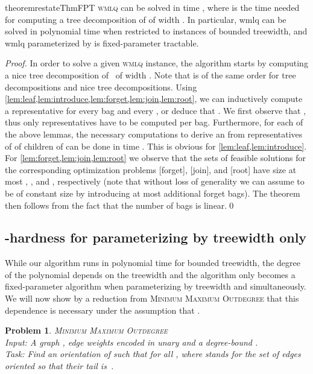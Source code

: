 \documentclass{llncs}
\newtheorem{pr}[theorem]{Problem}
\begin{document}
\begin{restatable}{theorem}{restateThmFPT}
\label{th:bounded_tw}
\textsc{wmlq} can be solved in time , where  is the time needed for computing a tree decomposition of  of width . In particular, {\sc wmlq} can be solved in polynomial time when restricted to instances of bounded treewidth, and {\sc wmlq} parameterized by  is fixed-parameter tractable. 
\end{restatable}

\begin{proof} 
  In order to solve a given \textsc{wmlq} instance, the algorithm starts by computing a nice tree decomposition of~ of width .  Note that  is of the same order for tree decompositions and nice tree decompositions. Using \cref{lem:leaf,lem:introduce,lem:forget,lem:join,lem:root}, we can inductively compute a representative  for every bag  and every , or deduce that . We first observe that , thus only  representatives have to be computed per bag. Furthermore, for each of the above lemmas, the necessary computations to derive an  from representatives of  of children  of  can be done in time . This is obvious for \cref{lem:leaf,lem:introduce}. For \cref{lem:forget,lem:join,lem:root} we observe that the sets of feasible solutions for the corresponding optimization problems [forget], [join], and [root] have size at most ,  , and , respectively (note that without loss of generality we can assume  to be of constant size by introducing at most  additional forget bags). The theorem then follows from the fact that the number of bags is linear.\qed
\end{proof}

\subsection{-hardness for parameterizing by treewidth only}

While our algorithm runs in polynomial time for bounded treewidth, the degree of the polynomial depends on the treewidth and the algorithm only becomes a fixed-parameter algorithm when parameterizing by treewidth and  simultaneously. We will now show by a reduction from \textsc{Minimum Maximum Outdegree} that this dependence is necessary under the assumption that . 

\begin{pr}\textsc{Minimum Maximum Outdegree}\ \\
	Input: A graph , edge weights  encoded in unary and a degree-bound .\\
Task: Find an orientation  of  such that  for all , where  stands for the set of edges oriented so that their tail is~.
\end{pr}
\end{document}

